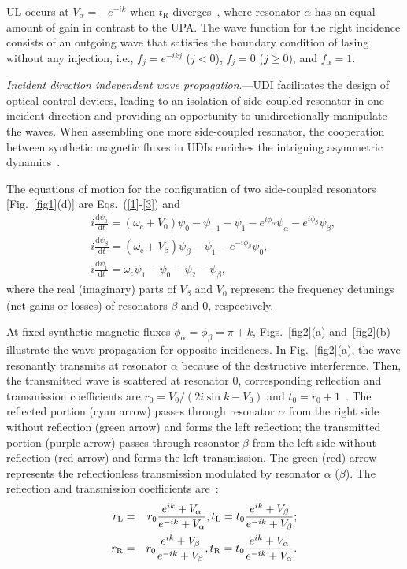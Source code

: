 \documentclass[prl,showpacs,superscriptaddress,twocolumn]{revtex4-1}
\begin{document}
UL occurs at $V_{\alpha }=-e^{-ik}$ when $t_{\mathrm{R}}$ diverges~\cite%
{Ali,USS,Ramezani2014}, where resonator $\alpha $ has an equal amount of
gain in contrast to the UPA. The wave function for the right incidence
consists of an outgoing wave that satisfies the boundary condition of lasing
without any injection, i.e., $f_{j}=e^{-ikj}$ ($j<0$), $f_{j}=0$ ($%
j\geqslant 0$), and $f_{\alpha }=1$.

\emph{Incident direction independent wave propagation}.---UDI facilitates
the design of optical control devices, leading to an isolation of
side-coupled resonator in one incident direction and providing an
opportunity to unidirectionally manipulate the waves. When assembling one
more side-coupled resonator, the cooperation between synthetic magnetic
fluxes in UDIs enriches the intriguing asymmetric dynamics~\cite{JLNJP}.

The equations of motion for the configuration of two side-coupled resonators
[Fig.~\ref{fig1}(d)] are Eqs.~(\ref{1}-\ref{3}) and
\begin{eqnarray}
&&i\frac{\mathrm{d}\psi _{0}}{\mathrm{d}t}=\left( \omega _{\mathrm{c}%
}+V_{0}\right) \psi _{0}-\psi _{-1}-\psi _{1}-e^{i\phi _{\alpha }}\psi
_{\alpha }-e^{i\phi _{\beta }}\psi _{\beta }, \\
&&i\frac{\mathrm{d}\psi _{\beta }}{\mathrm{d}t}=\left( \omega _{\mathrm{c}%
}+V_{\beta }\right) \psi _{\beta }-\psi _{1}-e^{-i\phi _{\beta }}\psi _{0},
\\
&&i\frac{\mathrm{d}\psi _{1}}{\mathrm{d}t}=\omega _{\mathrm{c}}\psi
_{1}-\psi _{0}-\psi _{2}-\psi _{\beta },
\end{eqnarray}
where the real (imaginary) parts of $V_{\beta }$ and $V_{0}$ represent the
frequency detunings (net gains or losses) of resonators $\beta $ and $0$,
respectively.

At fixed synthetic magnetic fluxes $\phi _{\alpha }=\phi _{\beta }=\pi +k$,
Figs.~\ref{fig2}(a) and~\ref{fig2}(b) illustrate the wave propagation for
opposite incidences. In Fig.~\ref{fig2}(a), the wave resonantly transmits at
resonator $\alpha $ because of the destructive interference. Then, the
transmitted wave is scattered at resonator $0$, corresponding reflection and
transmission coefficients are $r_{0}=V_{0}/(2i\sin k-V_{0})$ and $%
t_{0}=r_{0}+1$~\cite{Kim}. The reflected portion (cyan arrow) passes through
resonator $\alpha $ from the right side without reflection (green arrow) and
forms the left reflection; the transmitted portion (purple arrow) passes
through resonator $\beta $ from the left side without reflection (red arrow)
and forms the left transmission. The green (red) arrow represents the
reflectionless transmission modulated by resonator $\alpha $ ($\beta $). The
reflection and transmission coefficients are~\cite{Supplementary}:%
\begin{eqnarray}
r_{\text{\textrm{L}}} &=&r_{0}\frac{e^{ik}+V_{\alpha }}{e^{-ik}+V_{\alpha }}%
,t_{\mathrm{L}}=t_{0}\frac{e^{ik}+V_{\beta }}{e^{-ik}+V_{\beta }};
\label{DSL} \\
r_{\mathrm{R}} &=&r_{0}\frac{e^{ik}+V_{\beta }}{e^{-ik}+V_{\beta }},t_{%
\mathrm{R}}=t_{0}\frac{e^{ik}+V_{\alpha }}{e^{-ik}+V_{\alpha }}.  \label{DSR}
\end{eqnarray}
\end{document}
